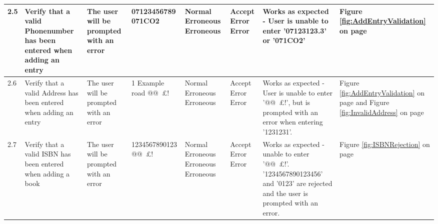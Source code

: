 \begin{landscape}
\begin{center}
\begin{longtable}{|p{1.5cm}|p{2cm}|p{2.5cm}|p{2.5cm}|p{2cm}|p{2cm}|p{2cm}|p{2cm}|}
        2.5 & Verify that a valid Phonenumber has been entered when adding an entry & The user will be prompted with an error & 07123456789 \newline 07123123.3 \newline 071CO2 & Normal \newline Erroneous \newline Erroneous & Accept \newline Error \newline Error & Works as expected - User is unable to enter '07123123.3' or '071CO2' & Figure \ref{fig:AddEntryValidation} on page \pageref{fig:AddEntryValidation} \\ \hline
        2.6 & Verify that a valid Address has been entered when adding an entry & The user will be prompted with an error & 1 Example road \newline @@~£! \newline 1231231 & Normal \newline Erroneous \newline Erroneous & Accept \newline Error \newline Error & Works as expected - User is unable to enter '@@~£!', but is prompted with an error when entering '1231231'. & Figure \ref{fig:AddEntryValidation} on page \pageref{fig:AddEntryValidation} and Figure \ref{fig:InvalidAddress} on page \pageref{fig:InvalidAddress} \\ \hline
\rowcolor{lightgray} 2.7 & Verify that a valid ISBN has been entered when adding a book & The user will be prompted with an error & 1234567890123 \newline @@~£! \newline 1234567890123456 \newline 0123 & Normal \newline Erroneous \newline Erroneous \newline Erroneous & Accept \newline Error \newline Error & Works as expected - unable to enter '@@~£!'. '1234567890123456' and '0123' are rejected and the user is prompted with an error. & Figure \ref{fig:ISBNRejection} on page \pageref{fig:ISBNRejection} \\ \hline

\end{longtable}
\end{center}
\end{landscape}
